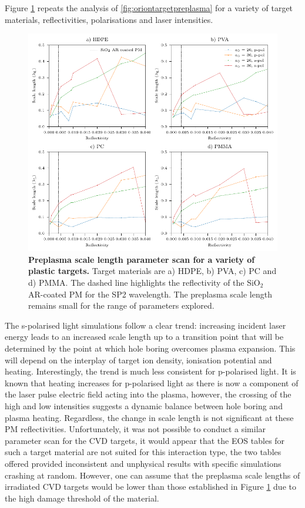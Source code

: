 Figure \ref{fig:orionscalelengthparameterscan} repeats the analysis of \ref{fig:oriontargetpreplasma} for a variety of target materials, reflectivities, polarisations and laser intensities.
\begin{figure}
	\centering
	\includegraphics{figures/orion/orion_scale_length_parameter_scan}
	\caption[Preplasma scale length parameter scan.]{\textbf{Preplasma scale length parameter scan for a variety of plastic targets.} Target materials are a) HDPE, b) PVA, c) PC and d) PMMA. The dashed line highlights the reflectivity of the SiO$_2$ AR-coated PM for the SP2 wavelength. The preplasma scale length remains small for the range of parameters explored.}
	\label{fig:orionscalelengthparameterscan}
\end{figure}
The s-polarised light simulations follow a clear trend: increasing incident laser energy leads to an increased scale length up to a transition point that will be determined by the point at which hole boring overcomes plasma expansion. This will depend on the interplay of target ion density, ionisation potential and heating. Interestingly, the trend is much less consistent for p-polarised light. It is known that heating increases for p-polarised light as there is now a component of the laser pulse electric field acting into the plasma, however, the crossing of the high and low intensities suggests a dynamic balance between hole boring and plasma heating. Regardless, the change in scale length is not significant at these PM reflectivities. Unfortunately, it was not possible to conduct a similar parameter scan for the CVD targets, it would appear that the EOS tables for such a target material are not suited for this interaction type, the two tables offered provided inconsistent and unphysical results with specific simulations crashing at random. However, one can assume that the preplasma scale lengths of irradiated CVD targets would be lower than those established in Figure \ref{fig:orionscalelengthparameterscan} due to the high damage threshold of the material. 

